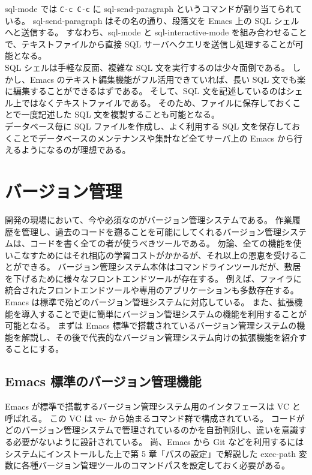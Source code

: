 sql-mode では \texttt{C-c C-c} に sql-send-paragraph というコマンドが割り当てられている。
sql-send-paragraph はその名の通り、段落文を Emacs 上の SQL シェルへと送信する。
すなわち、sql-mode と sql-interactive-mode を組み合わせることで、テキストファイルから直接 SQL サーバへクエリを送信し処理することが可能となる。\\

SQL シェルは手軽な反面、複雑な SQL 文を実行するのは少々面倒である。
しかし、Emacs のテキスト編集機能がフル活用できていれば、長い SQL 文でも楽に編集することができるはずである。
そして、SQL 文を記述しているのはシェル上ではなくテキストファイルである。
そのため、ファイルに保存しておくことで一度記述した SQL 文を複製することも可能となる。\\

データベース毎に SQL ファイルを作成し、よく利用する SQL 文を保存しておくことでデータベースのメンテナンスや集計など全てサーバ上の Emacs から行えるようになるのが理想である。
\section{バージョン管理}
開発の現場において、今や必須なのがバージョン管理システムである。
作業履歴を管理し、過去のコードを遡ることを可能にしてくれるバージョン管理システムは、コードを書く全ての者が使うべきツールである。
勿論、全ての機能を使いこなすためにはそれ相応の学習コストがかかるが、それ以上の恩恵を受けることができる。
バージョン管理システム本体はコマンドラインツールだが、敷居を下げるために様々なフロントエンドツールが存在する。
例えば、ファイラに統合されたフロントエンドツールや専用のアプリケーションも多数存在する。\\

Emacs は標準で殆どのバージョン管理システムに対応している。
また、拡張機能を導入することで更に簡単にバージョン管理システムの機能を利用することが可能となる。
まずは Emacs 標準で搭載されているバージョン管理システムの機能を解説し、その後で代表的なバージョン管理システム向けの拡張機能を紹介することにする。
\subsection{Emacs 標準のバージョン管理機能}
Emacs が標準で搭載するバージョン管理システム用のインタフェースは VC と呼ばれる。
この VC は vc- から始まるコマンド群で構成されている。
コードがどのバージョン管理システムで管理されているのかを自動判別し、違いを意識する必要がないように設計されている。
尚、Emacs から Git などを利用するにはシステムにインストールした上で第 5 章「パスの設定」で解説した exec-path 変数に各種バージョン管理ツールのコマンドパスを設定しておく必要がある。\\

